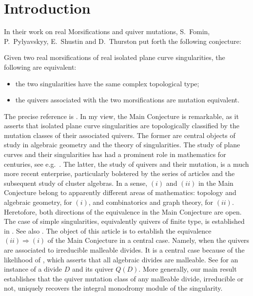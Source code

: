 \section{Introduction}\label{sec:introduction}

In their work on real Morsifications and quiver mutations, S.~Fomin, P.~Pylyavskyy, E.~Shustin and D.~Thurston put forth the following conjecture:\\
\vspace{-0.2cm}
\begin{fthm2}\label{conj:FPST}
Given two real morsifications of real isolated plane curve singularities, the following are equivalent:
\begin{itemize}
\item[$(i)$] the two singularities have the same complex topological type;
\item[$(ii)$] the quivers associated with the two morsifications are mutation equivalent.
\end{itemize}
\end{fthm2}
\vspace{0.2cm}
\noindent The precise reference is \cite[Conjecture 5.5]{FPST}. In my view, the Main Conjecture is remarkable, as it asserts that isolated plane curve singularities are
topologically classified by the mutation classes of their associated quivers. The former are central objects of study in algebraic geometry and the theory of singularities. The study of plane curves and their singularities has had a prominent role in mathematics for centuries, see e.g.~\cite{brieskorn1986, casas2000, ghys2017, milnor1968, wall2004, zariski2006}. The latter, the study of quivers and their mutation, is a much more recent enterprise, particularly bolstered by the series of articles \cite{Berenstein2005,Fomin2001,Fomin2003} and the subsequent study of cluster algebras. In a sense, $(i)$ and $(ii)$ in the Main Conjecture belong to apparently different areas of mathematics: topology and algebraic geometry, for $(i)$, and combinatorics and graph theory, for $(ii)$.\\

Heretofore, both directions of the equivalence in the Main Conjecture are open. The case of simple singularities, equivalently quivers of finite type, is established in \cite[Theorem 18.3]{FPST}. See also \cite[Conjecture 7.11 \& Corollary 9.10]{FPST}. The object of this article is to establish the equivalence $(ii)\Longrightarrow(i)$ of the Main Conjecture in a central case. Namely, when the quivers are associated to irreducible malleable divides. It is a central case because of the likelihood of \cite[Conjecture 14.10]{FPST}, which asserts that all algebraic divides are malleable. See  for an instance of a divide $D$ and its quiver $Q(D)$. More generally, our main result establishes that the quiver mutation class of any malleable divide, irreducible or not, uniquely recovers the integral monodromy module of the singularity.\\


